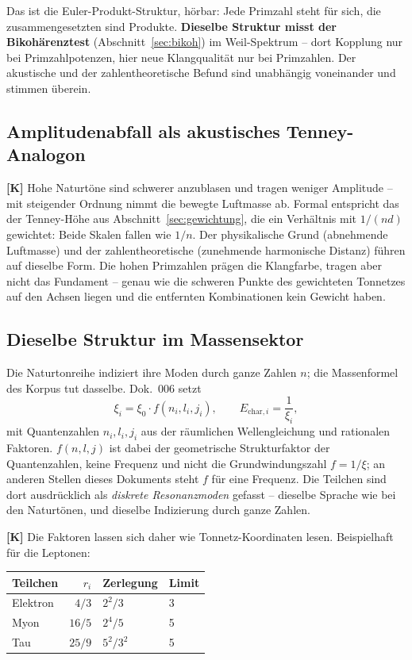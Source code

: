 Das ist die Euler-Produkt-Struktur, h\"orbar: Jede Primzahl steht f\"ur
sich, die zusammengesetzten sind Produkte. \textbf{Dieselbe Struktur
misst der Bikoh\"arenztest} (Abschnitt~\ref{sec:bikoh}) im
Weil-Spektrum -- dort Kopplung nur bei Primzahlpotenzen, hier neue
Klangqualit\"at nur bei Primzahlen. Der akustische und der
zahlentheoretische Befund sind unabh\"angig voneinander und stimmen
\"uberein.

\subsection{Amplitudenabfall als akustisches Tenney-Analogon}

\textbf{[K]} Hohe Naturt\"one sind schwerer anzublasen und tragen
weniger Amplitude -- mit steigender Ordnung nimmt die bewegte
Luftmasse ab. Formal entspricht das der Tenney-H\"ohe aus
Abschnitt~\ref{sec:gewichtung}, die ein Verh\"altnis mit $1/(nd)$
gewichtet: Beide Skalen fallen wie $1/n$. Der physikalische Grund
(abnehmende Luftmasse) und der zahlentheoretische (zunehmende
harmonische Distanz) f\"uhren auf dieselbe Form. Die hohen Primzahlen
pr\"agen die Klangfarbe, tragen aber nicht das Fundament -- genau wie
die schweren Punkte des gewichteten Tonnetzes auf den Achsen liegen
und die entfernten Kombinationen kein Gewicht haben.

\subsection{Dieselbe Struktur im Massensektor}
\label{sec:massen}

Die Naturtonreihe indiziert ihre Moden durch ganze Zahlen $n$; die
Massenformel des Korpus tut dasselbe. Dok.~006 setzt
\[
  \xi_i = \xi_0\cdot f(n_i, l_i, j_i),
  \qquad
  E_{\text{char},i} = \frac{1}{\xi_i},
\]
mit Quantenzahlen $n_i, l_i, j_i$ aus der r\"aumlichen Wellengleichung
und rationalen Faktoren. $f(n,l,j)$ ist dabei der geometrische
Strukturfaktor der Quantenzahlen, keine Frequenz und nicht die
Grundwindungszahl $f = 1/\xi$; an anderen Stellen dieses Dokuments
steht $f$ für eine Frequenz. Die Teilchen sind dort ausdr\"ucklich als
\emph{diskrete Resonanzmoden} gefasst -- dieselbe Sprache wie bei den
Naturt\"onen, und dieselbe Indizierung durch ganze Zahlen.

\textbf{[K]} Die Faktoren lassen sich daher wie Tonnetz-Koordinaten
lesen. Beispielhaft f\"ur die Leptonen:

\begin{center}
\begin{tabular}{lrll}
\toprule
Teilchen & $r_i$ & Zerlegung & Limit \\
\midrule
Elektron & $4/3$ & $2^2/3$ & 3 \\
Myon & $16/5$ & $2^4/5$ & 5 \\
Tau & $25/9$ & $5^2/3^2$ & 5 \\
\bottomrule
\end{tabular}
\end{center}

